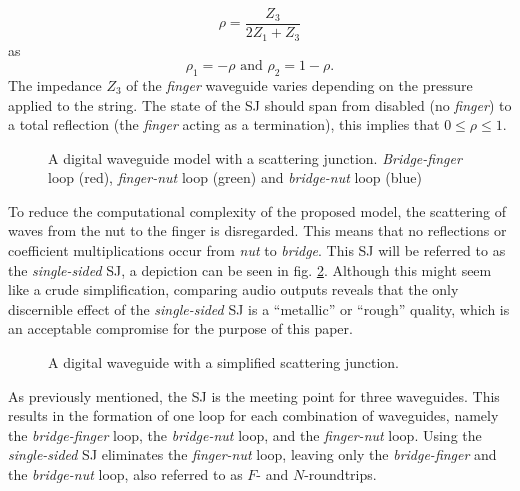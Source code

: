 \documentclass{sigchi}
\begin{document}
\begin{equation} \label{eq:rho}
	\rho=\frac{Z_3}{2Z_1+Z_3}
\end{equation}
as
\begin{equation}
	\rho_1=-\rho \text{ and } \rho_2=1-\rho.
\end{equation}
The impedance $Z_3$ of the \textit{finger} waveguide varies depending on the pressure applied to the string.
The state of the SJ should span from disabled (no \textit{finger}) to a total reflection (the \textit{finger} acting as a termination), this implies that $0 \leq \rho \leq 1$.

\begin{figure}[h]
	\centering
	\scalebox{0.56}{}
	\caption{A digital waveguide model with a scattering junction.
		\textit{Bridge-finger} loop (red), \textit{finger-nut} loop (green) and \textit{bridge-nut} loop (blue)}
	\label{fig:waveguide_sj}
\end{figure}

To reduce the computational complexity of the proposed model, the scattering of waves from the nut to the finger is disregarded.
This means that no reflections or coefficient multiplications occur from \textit{nut} to \textit{bridge}.
This SJ will be referred to as the \textit{single-sided} SJ, a depiction can be seen in fig. \ref{fig:waveguide_simple_sj}.
Although this might seem like a crude simplification, comparing audio outputs reveals that the only discernible effect of the \textit{single-sided} SJ is a ``metallic'' or ``rough'' quality, which is an acceptable compromise for the purpose of this paper.
\begin{figure}[h]
	\centering
	\scalebox{0.6}{}
	\caption{A digital waveguide with a simplified scattering junction.}
	\label{fig:waveguide_simple_sj}
\end{figure}

As previously mentioned, the SJ is the meeting point for three waveguides.
This results in the formation of one loop for each combination of waveguides, namely the \textit{bridge-finger} loop, the \textit{bridge-nut} loop, and the \textit{finger-nut} loop.
Using the \textit{single-sided} SJ eliminates the \textit{finger-nut} loop, leaving only the \textit{bridge-finger} and the \textit{bridge-nut} loop, also referred to as $F$- and $N$-roundtrips.
\end{document}
